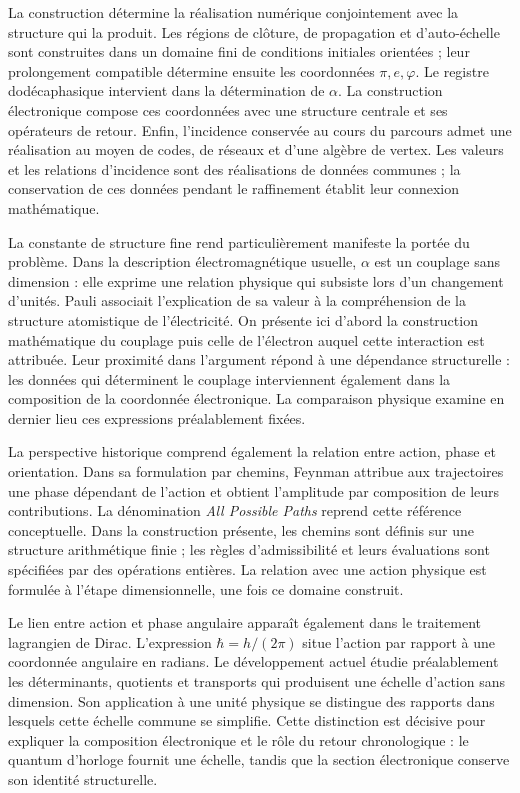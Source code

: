 La construction détermine la réalisation numérique conjointement avec la structure qui la produit. Les régions de clôture, de propagation et d'auto-échelle sont construites dans un domaine fini de conditions initiales orientées ; leur prolongement compatible détermine ensuite les coordonnées \(\pi,e,\varphi\). Le registre dodécaphasique intervient dans la détermination de \(\alpha\). La construction électronique compose ces coordonnées avec une structure centrale et ses opérateurs de retour. Enfin, l'incidence conservée au cours du parcours admet une réalisation au moyen de codes, de réseaux et d'une algèbre de vertex. Les valeurs et les relations d'incidence sont des réalisations de données communes ; la conservation de ces données pendant le raffinement établit leur connexion mathématique.





La constante de structure fine rend particulièrement manifeste la portée du
problème. Dans la description électromagnétique usuelle, \(\alpha\) est un
couplage sans dimension : elle exprime une relation physique qui subsiste lors
d'un changement d'unités. Pauli associait l'explication de sa valeur à la
compréhension de la structure atomistique de l'électricité\cite{pauli1946}.
On présente ici d'abord la construction mathématique du couplage puis
celle de l'électron auquel cette interaction est attribuée. Leur proximité
dans l'argument répond à une dépendance structurelle : les données qui
déterminent le couplage interviennent également dans la composition de la
coordonnée électronique. La comparaison physique examine en dernier lieu ces
expressions préalablement fixées.

La perspective historique comprend également la relation entre action, phase
et orientation. Dans sa formulation par chemins, Feynman attribue aux
trajectoires une phase dépendant de l'action et obtient l'amplitude par
composition de leurs contributions\cite{feynman1948}. La dénomination
\emph{All Possible Paths} reprend cette référence conceptuelle. Dans la construction
présente, les chemins sont définis sur une structure arithmétique finie ;
les règles d'admissibilité et leurs évaluations sont spécifiées par
des opérations entières. La relation avec une action physique est formulée à
l'étape dimensionnelle, une fois ce domaine construit.

Le lien entre action et phase angulaire apparaît également dans le traitement
lagrangien de Dirac\cite{dirac1933}. L'expression \(\hbar=h/(2\pi)\)
situe l'action par rapport à une coordonnée angulaire en radians. Le développement
actuel étudie préalablement les déterminants, quotients et transports qui
produisent une échelle d'action sans dimension. Son application à une unité
physique se distingue des rapports dans lesquels cette échelle commune se simplifie.
Cette distinction est décisive pour expliquer la composition électronique
et le rôle du retour chronologique : le quantum d'horloge fournit une
échelle, tandis que la section électronique conserve son identité structurelle.

